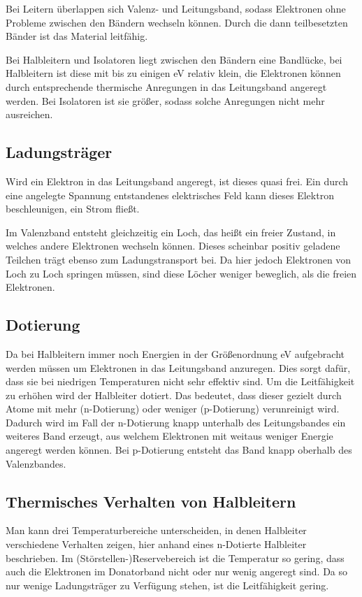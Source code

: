 Bei Leitern überlappen sich Valenz- und Leitungsband, sodass Elektronen ohne
Probleme zwischen den Bändern wechseln können. Durch die dann teilbesetzten
Bänder ist das Material leitfähig.

Bei Halbleitern und Isolatoren liegt zwischen den Bändern eine Bandlücke, bei
Halbleitern ist diese mit bis zu einigen \si{\electronvolt} relativ klein, die
Elektronen können durch entsprechende thermische Anregungen in das Leitungsband
angeregt werden. Bei Isolatoren ist sie größer, sodass solche Anregungen nicht
mehr ausreichen.

\subsection{Ladungsträger}

Wird ein Elektron in das Leitungsband angeregt, ist dieses quasi frei. Ein
durch eine angelegte Spannung entstandenes elektrisches Feld kann dieses
Elektron beschleunigen, ein Strom fließt.

Im Valenzband entsteht gleichzeitig ein Loch, das heißt ein freier Zustand, in
welches andere Elektronen wechseln können. Dieses scheinbar positiv geladene
Teilchen trägt ebenso zum Ladungstransport bei. Da hier jedoch Elektronen von
Loch zu Loch springen müssen, sind diese Löcher weniger beweglich, als die
freien Elektronen.

\subsection{Dotierung}

Da bei Halbleitern immer noch Energien in der Größenordnung \si{\electronvolt}
aufgebracht werden müssen um Elektronen in das Leitungsband anzuregen. Dies
sorgt dafür, dass sie bei niedrigen Temperaturen nicht sehr effektiv sind. Um
die Leitfähigkeit zu erhöhen wird der Halbleiter dotiert. Das bedeutet, dass
dieser gezielt durch Atome mit mehr (n-Dotierung) oder weniger (p-Dotierung)
verunreinigt wird. Dadurch wird im Fall der n-Dotierung knapp unterhalb des
Leitungsbandes ein weiteres Band erzeugt, aus welchem Elektronen mit weitaus
weniger Energie angeregt werden können. Bei p-Dotierung entsteht das Band knapp
oberhalb des Valenzbandes.

\subsection{Thermisches Verhalten von Halbleitern}

Man kann drei Temperaturbereiche unterscheiden, in denen Halbleiter
verschiedene Verhalten zeigen, hier anhand eines n-Dotierte Halbleiter
beschrieben. Im (Störstellen-)Reservebereich ist die Temperatur so gering, dass
auch die Elektronen im Donatorband nicht oder nur wenig angeregt sind. Da so
nur wenige Ladungsträger zu Verfügung stehen, ist die Leitfähigkeit gering.

